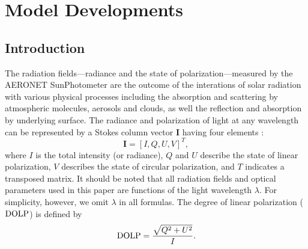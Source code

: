 \chapter{Model Developments} \label{ch:model}

\section{Introduction}

The radiation fields---radiance and the state of polarization---measured by the
AERONET SunPhotometer are the outcome of the interations of solar
radiation with various physical processes including the absorption and
scattering by atmospheric molecules, aerosols and clouds, as well the
reflection and absorption by underlying surface. 
The radiance and polarization of light at any wavelength can be represented by
a Stokes column vector $\mathbf{I}$ having four elements \citep{Hansen74}:
\begin{equation}
\mathbf{I} = [I,Q,U,V]^T,
\end{equation}
where $I$ is the total intensity (or radiance), $Q$ and $U$ describe the state of
linear polarization, $V$ describes the state of circular polarization, and $T$
indicates a transposed matrix. It should be noted that all radiation fields and
optical parameters used in this paper are functions of the light wavelength
$\lambda$. For simplicity, however, we omit $\lambda$ in all formulas. 
The degree of linear polarization ($\text{DOLP}$) is defined by
\begin{equation}
\text{DOLP} = \frac{\sqrt{Q^2+U^2}}{I}.
\end{equation}

